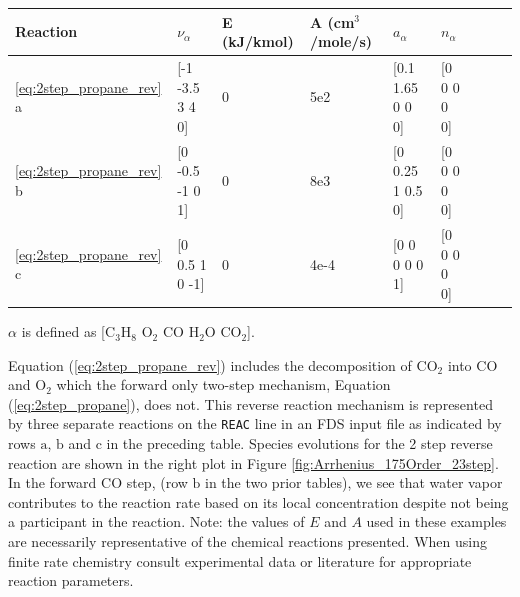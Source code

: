 \documentclass[11pt]{book}
\newcommand{\ct}{\tt\small}
\begin{document}
\begin{center}
\begin{tabular}{|l|l|l|l|l|l|l|l|l|}
\hline Reaction & $\nu_{\alpha}$ & E (kJ/kmol) & A (cm$^3$/mole/s) & $a_{\alpha}$ & $n_{\alpha}$  \\ \hline \hline
\ref{eq:2step_propane_rev} a & [-1 -3.5 3 4 0] & 0 & 5e2  & [0.1 1.65 0 0 0] & [0 0 0 0 0] \\ \hline
\ref{eq:2step_propane_rev} b & [0 -0.5 -1 0 1] & 0 & 8e3  & [0 0.25 1 0.5 0] & [0 0 0 0 0] \\ \hline
\ref{eq:2step_propane_rev} c & [0 0.5 1 0 -1]  & 0 & 4e-4 & [0 0 0 0 0 1]    & [0 0 0 0 0] \\ \hline
\end{tabular}
\vskip8pt
$\alpha$ is defined as [$\mathrm{C_3H_8}$ $\mathrm{O_2}$ $\mathrm{CO}$ $\mathrm{H_2O}$ $\mathrm{CO_2}$].
\end{center}
Equation (\ref{eq:2step_propane_rev}) includes the decomposition of $\mathrm{CO_2}$ into $\mathrm{CO}$ and $\mathrm{O_2}$ which the forward only two-step mechanism, Equation (\ref{eq:2step_propane}), does not. This reverse reaction mechanism is represented by three separate reactions on the {\ct REAC} line in an FDS input file as indicated by rows $\mathrm{a}$, $\mathrm{b}$ and $\mathrm{c}$ in the preceding table. Species evolutions for the 2 step reverse reaction are shown in the right plot in Figure \ref{fig:Arrhenius_175Order_23step}. In the forward CO step, (row $\mathrm{b}$ in the two prior tables), we see that water vapor contributes to the reaction rate based on its local concentration despite not being a participant in the reaction.
\vskip8pt
Note: the values of $E$ and $A$ used in these examples are necessarily representative of the chemical reactions presented. When using finite rate chemistry consult experimental data or literature for appropriate reaction parameters.
\end{document}
